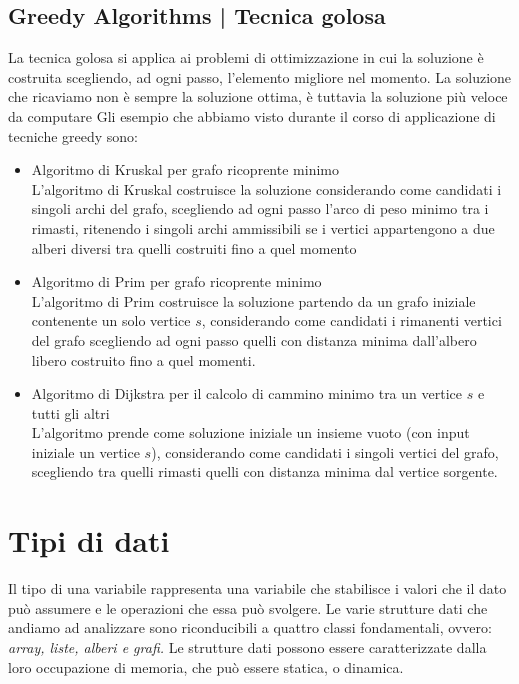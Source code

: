 \documentclass[11pt, oneside]{article}   	%
\begin{document}
\subsection{Greedy Algorithms | Tecnica golosa}
La tecnica golosa si applica ai problemi di ottimizzazione in cui la soluzione è costruita scegliendo, ad ogni passo, l'elemento migliore nel momento. La soluzione che ricaviamo non è sempre la soluzione ottima, è tuttavia la soluzione più veloce da computare
Gli esempio che abbiamo visto durante il corso di applicazione di tecniche greedy sono:
\begin{itemize}
\item Algoritmo di Kruskal per grafo ricoprente minimo\\
L'algoritmo di Kruskal costruisce la soluzione considerando come candidati i singoli archi del grafo, scegliendo ad ogni passo l'arco di peso minimo tra i rimasti, ritenendo i singoli archi ammissibili se i vertici appartengono a due alberi diversi tra quelli costruiti fino a quel momento
\item Algoritmo di Prim per grafo ricoprente minimo\\
L'algoritmo di Prim costruisce la soluzione partendo da un grafo iniziale contenente un solo vertice $s$, considerando come candidati i rimanenti vertici del grafo scegliendo ad ogni passo quelli con distanza minima dall'albero libero costruito fino a quel momenti.
\item Algoritmo di Dijkstra per il calcolo di cammino minimo tra un vertice $s$ e tutti gli altri\\
L'algoritmo prende come soluzione iniziale un insieme vuoto (con input iniziale un vertice $s$), considerando come candidati i singoli vertici del grafo, scegliendo tra quelli rimasti quelli con distanza minima dal vertice sorgente.
\end{itemize}




\section{Tipi di dati}
Il tipo di una variabile rappresenta una variabile che stabilisce i valori che il dato può assumere e le operazioni che essa può svolgere. Le varie strutture dati che andiamo ad analizzare sono riconducibili a quattro classi fondamentali, ovvero: \emph{array, liste, alberi e grafi.} Le strutture dati possono essere caratterizzate dalla loro occupazione di memoria, che può essere statica, o dinamica.
\end{document}
